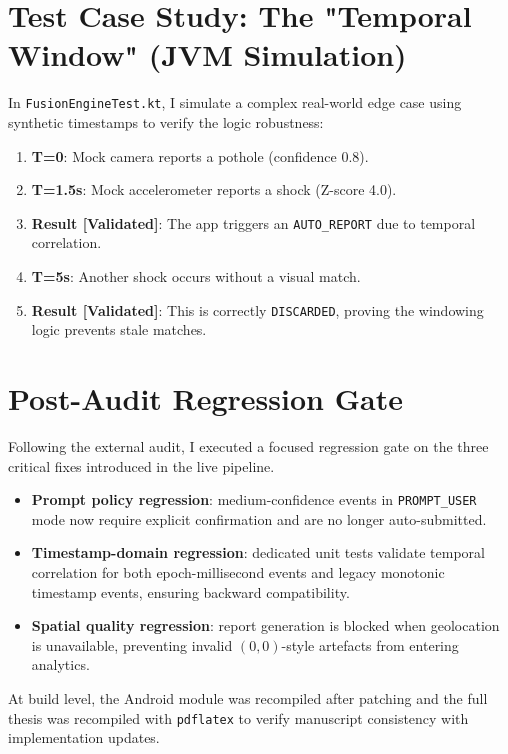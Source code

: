 \section{Test Case Study: The "Temporal Window" (JVM Simulation)}
In \texttt{FusionEngineTest.kt}, I simulate a complex real-world edge case using synthetic timestamps to verify the logic robustness:
\begin{enumerate}
    \item \textbf{T=0}: Mock camera reports a pothole (confidence 0.8).
    \item \textbf{T=1.5s}: Mock accelerometer reports a shock (Z-score 4.0).
    \item \textbf{Result [Validated]}: The app triggers an \texttt{AUTO\_REPORT} due to temporal correlation.
    \item \textbf{T=5s}: Another shock occurs without a visual match.
    \item \textbf{Result [Validated]}: This is correctly \texttt{DISCARDED}, proving the windowing logic prevents stale matches.
\end{enumerate}

\section{Post-Audit Regression Gate}
Following the external audit, I executed a focused regression gate on the three critical fixes introduced in the live pipeline.

\begin{itemize}
    \item \textbf{Prompt policy regression}: medium-confidence events in \texttt{PROMPT\_USER} mode now require explicit confirmation and are no longer auto-submitted.
    \item \textbf{Timestamp-domain regression}: dedicated unit tests validate temporal correlation for both epoch-millisecond events and legacy monotonic timestamp events, ensuring backward compatibility.
    \item \textbf{Spatial quality regression}: report generation is blocked when geolocation is unavailable, preventing invalid $(0,0)$-style artefacts from entering analytics.
\end{itemize}

At build level, the Android module was recompiled after patching and the full thesis was recompiled with \texttt{pdflatex} to verify manuscript consistency with implementation updates.

